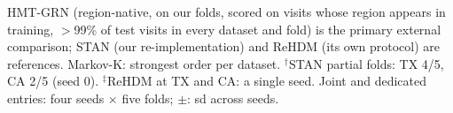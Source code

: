 \begin{table}[htbp]
\vspace{2pt}
{\footnotesize HMT-GRN (region-native, on
our folds, scored on visits whose region appears in training, $>$99\% of test visits in every dataset
and fold) is the primary external comparison; STAN (our re-implementation) and ReHDM (its own protocol)
are references. Markov-K: strongest order per dataset. $^{\dagger}$STAN partial folds: TX 4/5, CA 2/5
(seed 0). $^{\ddagger}$ReHDM at TX and CA: a single seed. Joint and dedicated entries: four seeds
$\times$ five folds; $\pm$: sd across seeds.}
\end{table}
